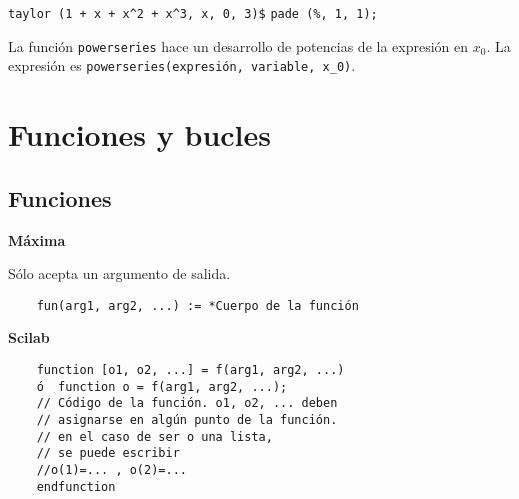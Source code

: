 \documentclass[a4paper]{article}
\begin{document}
\verb|taylor (1 + x + x^2 + x^3, x, 0, 3)$|
\verb|pade (%, 1, 1);|

La función \verb|powerseries| hace un desarrollo de potencias de la expresión en $x_0$. La expresión es \verb|powerseries(expresión, variable, x_0)|.

\section{Funciones y bucles}
\subsection{Funciones}

\begin{multicols}{2}
	\begin{center}
		\textbf{Máxima}
	\end{center}
	Sólo acepta un argumento de salida.
	\begin{verbatim}
	fun(arg1, arg2, ...) := *Cuerpo de la función
	\end{verbatim}
	
	\columnbreak
	
	\begin{center}
		\textbf{Scilab}
	\end{center}
		\begin{verbatim}
	function [o1, o2, ...] = f(arg1, arg2, ...)  
	ó  function o = f(arg1, arg2, ...);
	// Código de la función. o1, o2, ... deben 
	// asignarse en algún punto de la función.
	// en el caso de ser o una lista, 
	// se puede escribir 
	//o(1)=... , o(2)=...
	endfunction
	\end{verbatim}
	
\end{multicols}
\end{document}
